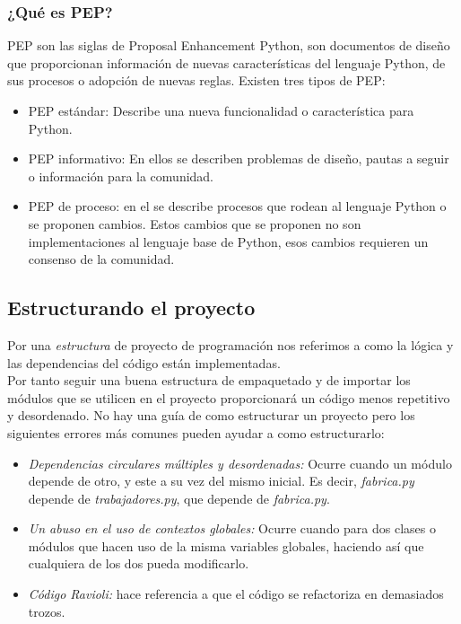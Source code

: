\subsubsection*{¿Qué es PEP?}
PEP son las siglas de Proposal Enhancement Python, son documentos de diseño que proporcionan información de nuevas características del lenguaje Python, de sus procesos o adopción de nuevas reglas. Existen tres tipos de PEP:
\begin{itemize}
    \item PEP estándar: Describe una nueva funcionalidad o característica para Python. 
    \item PEP informativo: En ellos se describen problemas de diseño, pautas a seguir o información para la comunidad.
    \item PEP de proceso: en el se describe procesos que rodean al lenguaje Python o se proponen cambios. Estos cambios que se proponen no son implementaciones al lenguaje base de Python, esos cambios requieren un consenso de la comunidad. 
\end{itemize}

\subsection*{Estructurando el proyecto}
\label{subsec:structurePython}
Por una \emph{estructura} de proyecto de programación nos referimos a como la lógica y las dependencias del código están implementadas. \\
Por tanto seguir una buena estructura de empaquetado y de importar los módulos que se utilicen en el proyecto proporcionará un código menos repetitivo y desordenado. No hay una guía de como estructurar un proyecto pero los siguientes errores más comunes pueden ayudar a  como estructurarlo:
\begin{itemize}
    \item \textit{Dependencias circulares múltiples y desordenadas:} Ocurre cuando un módulo depende de otro, y este a su vez del mismo inicial. Es decir, \textit{fabrica.py} depende de \textit{trabajadores.py}, que depende de \textit{fabrica.py}.
    \item \textit{Un abuso en el uso de contextos globales:} Ocurre cuando para dos clases o módulos que hacen uso de la misma variables globales, haciendo así que cualquiera de los dos pueda modificarlo.
    \item \textit{Código Ravioli:} hace referencia a que el código se refactoriza en demasiados trozos.
\end{itemize}

